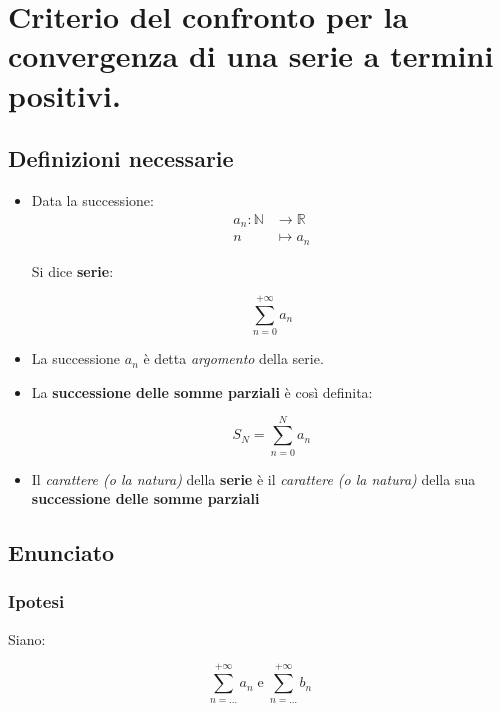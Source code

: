 \documentclass[../dimostrazioni]{subfiles}
\begin{document}
    \chapter{Criterio del confronto per la convergenza di una serie a termini positivi.}
    \label{serieconfronto}

        \section*{Definizioni necessarie}

            \begin{itemize}
                \item Data la successione:
                        \begin{align*}
                            a_n : \mathbb{N} &\longrightarrow \mathbb{R}\\
                            n &\longmapsto a_n 
                        \end{align*}
    
                        Si dice \textbf{serie}:

                        \[  \sum_{n=0}^{+\infty} a_n\]

                \item La successione \(a_n\) è detta \textit{argomento} della serie.
                \item La \textbf{successione delle somme parziali} è così definita:
                      
                        \[  S_N = \sum_{n=0}^{N} a_n\]
                    
                \item Il  \textit{carattere (o la natura)} della \textbf{serie} è il \textit{carattere (o la natura)} della sua \textbf{successione delle somme parziali}
            \end{itemize}
           

        \section*{Enunciato}

            \subsection*{Ipotesi}

                Siano:

                \[  \sum_{n=\dots}^{+\infty} a_n \; \text{e} \;  \sum_{n=\dots}^{+\infty} b_n   \]
\end{document}
